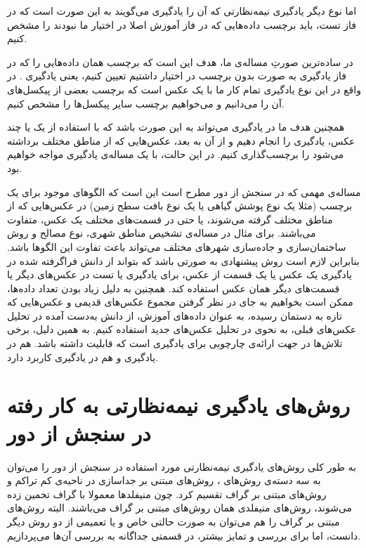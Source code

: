 \documentclass[11pt]{article}
\begin{document}
اما نوع دیگر یادگیری نیمه‌نظارتی که آن را یادگیری \inductive{} می‌گویند به این صورت است که در فاز تست، باید برچسب داده‌هایی که در فاز آموزش اصلا در اختیار ما نبودند را مشخص کنیم.

در ساده‌ترین صورتِ مساله‌ی ما، هدف این است که برچسب همان داده‌هایی را که در فاز یادگیری به صورت بدون برچسب در اختیار داشتیم تعیین کنیم، یعنی یادگیری \transductive. در واقع در این نوع یادگیری تمام کار ما با یک عکس \hyperspec{} است که برچسب بعضی از پیکسل‌های آن را می‌دانیم و می‌خواهیم برچسب سایر پیکسل‌ها را مشخص کنیم.

همچنین هدف ما در یادگیری می‌تواند به این صورت باشد که با استفاده از یک یا چند عکس، یادگیری را انجام دهیم و از آن به بعد، عکس‌هایی که از مناطق مختلف برداشته می‌شود را برچسب‌گذاری کنیم. در این حالت، با یک مساله‌ی یادگیری \inductive{} مواجه خواهیم بود.

مساله‌ی مهمی که در سنجش از دور مطرح است این است که الگوهای موجود برای یک برچسب (مثلا یک نوع پوشش گیاهی یا یک نوع بافت سطح زمین) در عکس‌هایی که از مناطق مختلف گرفته می‌شوند، یا حتی در قسمت‌های مختلف یک عکس، متفاوت می‌باشند. برای مثال در مساله‌ی تشخیص مناطق شهری، نوع مصالح و روش ساختمان‌سازی و جاده‌سازی شهر‌های مختلف می‌تواند باعث تفاوت این الگوها باشد. بنابراین لازم است روش پیشنهادی به صورتی باشد که بتواند از دانش فراگرفته شده در یادگیری یک عکس یا یک قسمت از عکس، برای یادگیری یا تست در عکس‌های دیگر یا قسمت‌های دیگر همان عکس استفاده کند.  همچنین به دلیل زیاد بودن تعداد داده‌ها، ممکن است بخواهیم به جای در نظر گرفتن مجموع عکس‌های قدیمی و عکس‌هایی که تازه به دستمان رسیده، به عنوان داده‌های آموزش، از دانش به‌دست آمده در تحلیل عکس‌های قبلی، به نحوی در تحلیل عکس‌های جدید استفاده کنیم.
به همین دلیل، برخی تلاش‌ها در جهت ارائه‌ی چارچوبی برای یادگیری است که قابلیت \knowledgetransfer{}
داشته باشد. \knowledgetransfer{} هم در یادگیری \inductive{} و هم در یادگیری \transductive{} کاربرد دارد.


\section{
روش‌های یادگیری نیمه‌نظارتی  به کار رفته در سنجش از دور
}
به طور کلی روش‌های یادگیری نیمه‌نظارتی مورد استفاده در سنجش از دور را می‌توان به سه دسته‌ی روش‌های \generative{}،
 روش‌های مبتنی بر جداسازی در ناحیه‌ی کم تراکم و روش‌های مبتنی بر گراف تقسیم کرد. چون منیفلدها معمولا با گراف تخمین زده می‌شوند، روش‌های منیفلدی همان روش‌های مبتنی بر گراف می‌باشند. البته روش‌های مبتنی بر گراف را هم می‌توان به صورت حالتی خاص و یا تعمیمی از دو روش دیگر دانست، اما برای بررسی و تمایز بیشتر، در قسمتی جداگانه به بررسی آن‌ها می‌پردازیم.
\end{document}
